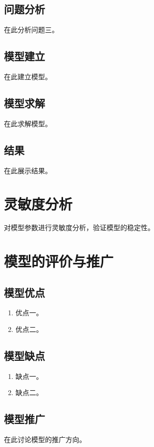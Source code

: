 \documentclass[withoutpreface]{cumcmthesis}
\begin{document}
\subsection{问题分析}
在此分析问题三。

\subsection{模型建立}
在此建立模型。

\subsection{模型求解}
在此求解模型。

\subsection{结果}
在此展示结果。

\section{灵敏度分析}
对模型参数进行灵敏度分析，验证模型的稳定性。

\section{模型的评价与推广}
\subsection{模型优点}
\begin{enumerate}
    \item 优点一。
    \item 优点二。
\end{enumerate}

\subsection{模型缺点}
\begin{enumerate}
    \item 缺点一。
    \item 缺点二。
\end{enumerate}

\subsection{模型推广}
在此讨论模型的推广方向。
\end{document}
